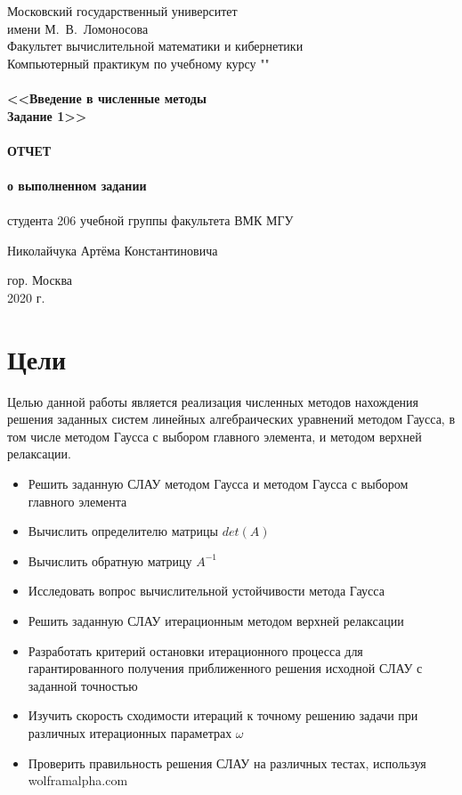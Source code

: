 \documentclass[a4paper,12pt,titlepage,finall]{article}
\begin{document}
\begin{titlepage}
    \begin{center}
	{\small \sc Московский государственный университет \\имени М.~В.~Ломоносова\\
	Факультет вычислительной математики и кибернетики\\}
	\vfill
	{\Large \sc Компьютерный практикум по учебному курсу ""}\\
	~\\
	{\large \bf <<Введение в численные методы \\
	Задание 1>>}\\
	~\\
	{\large \bf  ОТЧЕТ \\ }
	~\\
	{\small \bf  о выполненном задании \\ }
	~\\
	{\small \sc студента 206 учебной группы факультета ВМК МГУ\\}

	{\small \sc Николайчука Артёма Константиновича\\}
	\vfill
    \end{center}

    \begin{center}
	\vfill
	{\small гор. Москва\\2020 г.}
    \end{center}
\end{titlepage}

\tableofcontents
\newpage

\section{Цели}

Целью данной работы является реализация численных методов нахождения 
решения заданных систем линейных алгебраических уравнений методом Гаусса, в том числе методом Гаусса с выбором главного элемента, и методом верхней релаксации. 

\begin{itemize}
\item Решить заданную СЛАУ  методом Гаусса и методом Гаусса с выбором главного элемента
\item Вычислить определителю матрицы $det(A)$
\item Вычислить обратную матрицу  $A ^ {-1}$
\item Исследовать вопрос вычислительной  устойчивости метода Гаусса
\item Решить заданную СЛАУ итерационным методом верхней релаксации
\item Разработать критерий остановки итерационного процесса для гарантированного получения приближенного решения исходной СЛАУ с заданной точностью
\item Изучить скорость сходимости итераций к точному решению задачи при различных итерационных параметрах $\omega$
\item Проверить правильность решения СЛАУ на различных тестах, используя wolframalpha.com
\end{itemize}
\end{document}
